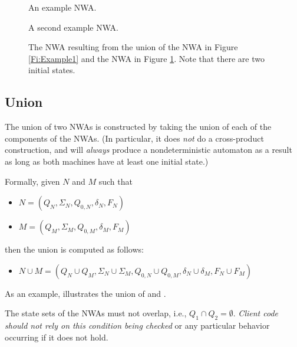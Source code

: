 \begin{figure}[tb]
  \centering
  \begin{minipage}{0.49\textwidth}
    \centering
    \caption{An example NWA.}
    \label{Fi:Example1}
  \end{minipage}
  \begin{minipage}{0.49\textwidth}
    \centering
    \caption{A second example NWA.}
    \label{Fi:Union1}
  \end{minipage}
\end{figure}

\begin{figure}[tbp]
  \centering
  \caption{The NWA resulting from the union of the NWA in Figure
    \ref{Fi:Example1} and the NWA in Figure \ref{Fi:Union1}. Note that there
    are two initial states.}
  \label{Fi:Union2}
\end{figure}



\subsection{Union}
\label{Se:Union}
The union of two NWAs is constructed by taking the union of each of the
components of the NWAs. (In
particular, it does \textsl{not} do a cross-product construction, and will
\textsl{always} produce a nondeterministic automaton as a result as long as
both machines have at least one initial state.)

Formally, given $N$ and $M$ such that
\begin{itemize}
 \item $N = (Q_N, \Sigma_N, Q_{0,N}, \delta_N, F_N)$
 \item $M = (Q_M, \Sigma_M, Q_{0,M}, \delta_M, F_M)$
\end{itemize}
then the union is computed as follows:
\begin{itemize}
 \item $N \cup M = (Q_N \cup Q_M, \Sigma_N \cup \Sigma_M, Q_{0,N} \cup
   Q_{0,M}, \delta_N \cup \delta_M, F_N \cup F_M)$
\end{itemize}

As an example,  illustrates the union of  and
.


The state sets of the NWAs must not overlap,
i.e., $Q_1 \cap Q_2 = \emptyset$. \textsl{Client code should not rely on
  this condition being checked} or any particular behavior occurring if it
does not hold.

